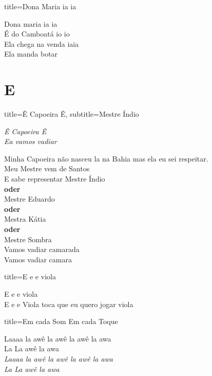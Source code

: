 \documentclass[fontsize=14pt, paper=a4, twoside, DIV=20]{scrreprt} %
\newcommand\chapTOC[1]{
    \chapter*{#1}
    \addcontentsline{toc}{chapter}{#1}
    \markboth{#1}{#1}}
\begin{document}
\begin{multicols*}{2}
\begin{song}{title={Dona Maria ia ia}}
        \begin{verse*}
            Dona maria ia ia\\
            É do Camboatá io io\\
            Ela chega na venda iaia\\
            Ela manda botar\\
        \end{verse*}
\end{song}

\chapTOC{E}


\begin{song}{title={Ê Capoeira Ê}, subtitle={Mestre Índio}}
    \begin{chorus*}
        \textit{Ê Capoeira Ê \\
        Ea vamos vadiar\\}
    \end{chorus*}
        \begin{verse*}
            Minha Capoeira não nasceu la na Bahia mas ela eu sei respeitar.\\
            Meu Mestre vem de Santos\\
            E sabe representar Mestre Índio \\ 
            \textbf{oder}\\
            Mestre Eduardo\\
            \textbf{oder}\\
            Mestra Kátia\\
            \textbf{oder}\\
            Mestre Sombra\\

            Vamos vadiar camarada\\
            Vamos vadiar camara\\
        \end{verse*}
\end{song}



\begin{song}{title={E e e viola}}
        \begin{verse*}
            E e e viola\\
            E e e Viola toca que eu quero jogar viola\\
        \end{verse*}
\end{song}

\columnbreak
\begin{song}{title={Em cada Som Em cada Toque}}
    \begin{chorus*}
            Laaaa la awê la awê la awê la awa\\
            La La awê la awa\\
            \textit{Laaaa la awê la awê la awê la awa}\\
            \textit{La La awê la awa}\\
    \end{chorus*}
        \begin{verse*}


\end{verse*}
\end{song}
\end{multicols*}
\end{document}
